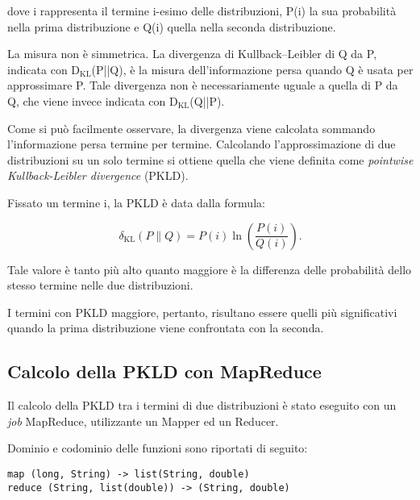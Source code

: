 dove i rappresenta il termine i-esimo delle distribuzioni, P(i) la sua probabilità nella prima distribuzione e Q(i) quella nella seconda distribuzione.

La misura non è simmetrica. La divergenza di Kullback–Leibler di Q da P, indicata con D$_{\text{KL}}$(P||Q), è la misura dell'informazione persa quando Q è usata per approssimare P. 
Tale divergenza non è necessariamente uguale a quella di P da Q, che viene invece indicata con D$_{\text{KL}}$(Q||P).

Come si può facilmente osservare, la divergenza viene calcolata sommando l'informazione persa termine per termine. Calcolando l'approssimazione di due distribuzioni su un solo termine si
ottiene quella che viene definita come \textit{pointwise Kullback-Leibler divergence} (PKLD).

Fissato un termine i, la PKLD è data dalla formula:

\begin{equation} \label{eq:2}
\delta_{\mathrm{KL}}(P\|Q) = P(i) \ln\left(\frac{P(i)}{Q(i)}\right).
\end{equation}

Tale valore è tanto più alto quanto maggiore è la differenza delle probabilità dello stesso termine nelle due distribuzioni.

I termini con PKLD maggiore, pertanto, risultano essere quelli più significativi quando la prima distribuzione viene confrontata con la seconda.


\subsection{Calcolo della PKLD con MapReduce}
\label{par:kldmapred}

Il calcolo della PKLD tra i termini di due distribuzioni è stato eseguito con un \textit{job} MapReduce, utilizzante un Mapper ed un Reducer.

Dominio e codominio delle funzioni sono riportati di seguito:

\begin{lstlisting}[frame=single]
map (long, String) -> list(String, double)
reduce (String, list(double)) -> (String, double)
\end{lstlisting}

